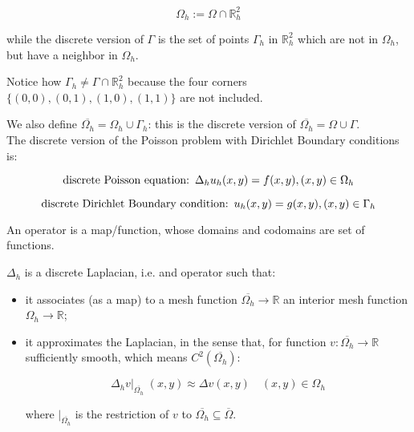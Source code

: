 \begin{equation}
	\Omega_h := \Omega \cap \mathbb{R}^2_h
\end{equation}


while the discrete version of $\Gamma$ is the set of points $\Gamma_h$ in $\mathbb{R}^2_h$ which are not in $\Omega_h$, but have a neighbor in $\Omega_h$.

Notice how $\Gamma_h \neq \Gamma \cap \mathbb{R}^2_h$ because the four corners $\{(0,0), (0,1), (1,0), (1,1)\}$ are not included. 

We also define $\overline{\Omega_h} = \Omega_h \cup \Gamma_h$: this is the discrete version of $\overline{\Omega_h}  = \Omega \cup \Gamma$.\\


The discrete version of the Poisson problem with Dirichlet Boundary conditions is:


\begin{equation}
\text{discrete Poisson equation:\enspace} \Delta_h u_h(x, y) = f(x, y), (x, y) \in \Omega_h
\end{equation}
	
\begin{equation}
\text{discrete Dirichlet Boundary condition:\enspace} u_h(x,y) = g(x, y), (x, y) \in \Gamma_h
\end{equation}


An operator is a map/function, whose domains and codomains are set of functions.

$\Delta_h$ is a discrete Laplacian, i.e. and operator such that:
\begin{itemize}
	\item it associates (as a map) to a mesh function $\overline{\Omega_h} \rightarrow \mathbb{R}$ an interior mesh function $\Omega_h \rightarrow \mathbb{R}$;
	
	\item it approximates the Laplacian, in the sense that, for function $v: \overline{\Omega_h} \rightarrow \mathbb{R}$ sufficiently smooth, which means $C^2(\overline{\Omega_h})$:
		
		\begin{equation}
			\Delta_h v |_{\overline{\Omega_h}} \; (x,y) \approx \Delta v(x, y) \quad (x, y) \in \Omega_h
		\end{equation}

	where $|_{\overline{\Omega_h}}$ is the restriction of $v$ to $\overline{\Omega_h}  \subseteq \overline{\Omega}$.	
\end{itemize}

